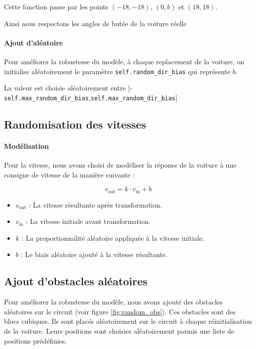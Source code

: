 \documentclass[french]{article}
\begin{document}
Cette fonction passe par les points $(-18, -18)$, $(0, b)$ et $(18, 18)$.

Ainsi nous respectons les angles de butée de la voiture réelle

\paragraph{Ajout d'aléatoire}

Pour améliorer la robustesse du modèle, à chaque replacement de la voiture, on initialise aléatoirement le paramètre \verb|self.random_dir_bias| qui représente $b$.

La valeur est choisie aléatoirement entre [-\verb|self.max_random_dir_bias|,\verb|self.max_random_dir_bias|]

\subsection{Randomisation des vitesses}

\paragraph{Modélisation}

Pour la vitesse, nous avons choisi de modéliser la réponse de la voiture à une consigne de vitesse de la manière suivante :

\begin{equation}
    v_{\mathrm{out}} = k \cdot v_{\mathrm{in}} + b
\end{equation}

\begin{itemize}
    \item \(v_{\mathrm{out}}\) : La vitesse résultante après transformation.
    \item \(v_{\mathrm{in}}\) : La vitesse initiale avant transformation.
    \item \(k\) : La proportionnalité aléatoire appliquée à la vitesse initiale.
    \item \(b\) : Le biais aléatoire ajouté à la vitesse résultante.
\end{itemize}

\subsection{Ajout d'obstacles aléatoires}

Pour améliorer la robustesse du modèle, nous avons ajouté des obstacles aléatoires sur le circuit (voir figure \ref{fig:random_obs}). Ces obstacles sont des blocs cubiques. Ils sont placés aléatoirement sur le circuit à chaque réinitialisation de la voiture. Leurs positions sont choisies aléatoirement parmis une liste de positions prédéfinies. 
\end{document}
